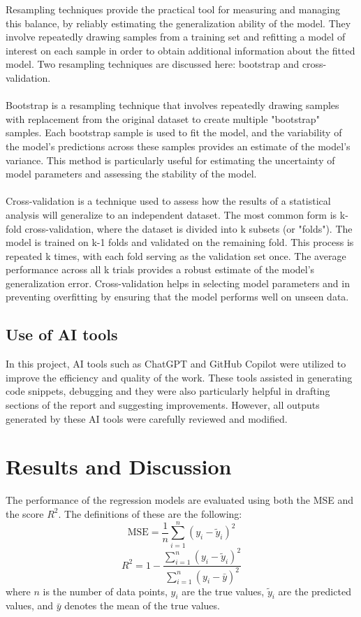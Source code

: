 \documentclass[
 reprint,            %
 amsmath,amssymb,
 aps,
]{revtex4-2}
\begin{document}
Resampling techniques provide the practical tool for measuring and managing this balance, by reliably estimating the generalization ability of the model.
They involve repeatedly drawing samples from a training set and refitting a model of interest on each sample in order to obtain additional information about the fitted model.
Two resampling techniques are discussed here: bootstrap and cross-validation.\\\\
Bootstrap is a resampling technique that involves repeatedly drawing samples with replacement from the original dataset to create multiple "bootstrap" samples\cite{hjorthjensen_week38}.
Each bootstrap sample is used to fit the model, and the variability of the model's predictions across these samples provides an estimate of the model's variance.
This method is particularly useful for estimating the uncertainty of model parameters and assessing the stability of the model.\\\\
Cross-validation is a technique used to assess how the results of a statistical analysis will generalize to an independent dataset\cite{hjorthjensen_week38}.
The most common form is k-fold cross-validation, where the dataset is divided into k subsets (or "folds").
The model is trained on k-1 folds and validated on the remaining fold.
This process is repeated k times, with each fold serving as the validation set once.
The average performance across all k trials provides a robust estimate of the model's generalization error.
Cross-validation helps in selecting model parameters and in preventing overfitting by ensuring that the model performs well on unseen data.

\subsection{Use of AI tools}
In this project, AI tools such as ChatGPT and GitHub Copilot were utilized to improve the efficiency and quality of the work. 
These tools assisted in generating code snippets, debugging and they were also particularly helpful in drafting sections of the report and suggesting improvements. 
However, all outputs generated by these AI tools were carefully reviewed and modified.


\section{Results and Discussion}
\label{sec:Results_and_Discussion}
The performance of the regression models are evaluated using both the MSE and the score $R^2$. The definitions of these are the following:
$$ \mathrm{MSE} = \frac{1}{n} \sum_{i=1}^{n} \left( y_i - \tilde{y}_i \right)^2$$
$$R^2 = 1 - \frac{\sum_{i=1}^{n} \left( y_i - \tilde{y}_i \right)^2}{\sum_{i=1}^{n} \left( y_i - \bar{y} \right)^2}$$
where $n$ is the number of data points, $y_i$ are the true values, $\tilde{y}_i$ are the predicted values, and $\bar{y}$ denotes the mean of the true values.
\end{document}
